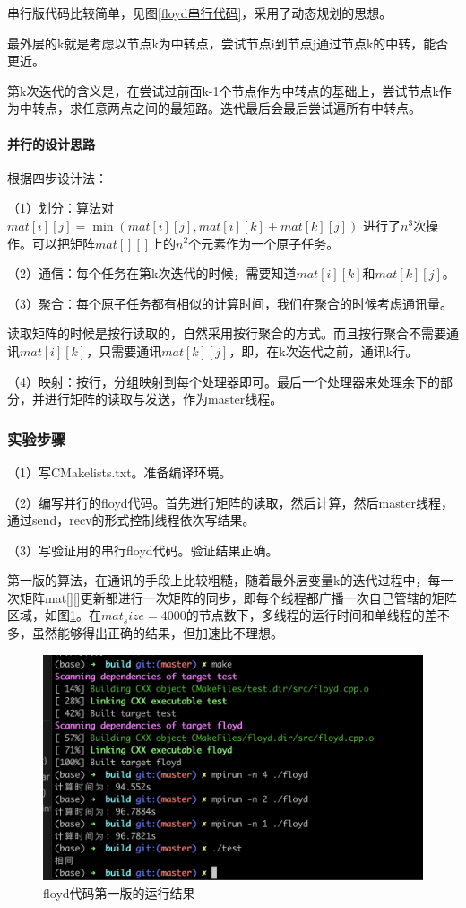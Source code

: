 \documentclass[10pt]{article}
\begin{document}
串行版代码比较简单，见图\ref{floyd串行代码}，采用了动态规划的思想。

最外层的k就是考虑以节点k为中转点，尝试节点i到节点j通过节点k的中转，能否更近。

第k次迭代的含义是，在尝试过前面k-1个节点作为中转点的基础上，尝试节点k作为中转点，求任意两点之间的最短路。迭代最后会最后尝试遍所有中转点。

\paragraph{并行的设计思路} 

根据四步设计法：

（1）划分：算法对$mat[i][j] = \min(mat[i][j], mat[i][k] + mat[k][j])$ 进行了$n^{3}$次操作。可以把矩阵$mat[][]$上的$n^{2}$个元素作为一个原子任务。

（2）通信：每个任务在第k次迭代的时候，需要知道$mat[i][k]$和$mat[k][j]$。

（3）聚合：每个原子任务都有相似的计算时间，我们在聚合的时候考虑通讯量。

读取矩阵的时候是按行读取的，自然采用按行聚合的方式。而且按行聚合不需要通讯$mat[i][k]$，只需要通讯$mat[k][j]$，即，在k次迭代之前，通讯k行。

（4）映射：按行，分组映射到每个处理器即可。最后一个处理器来处理余下的部分，并进行矩阵的读取与发送，作为master线程。


\subsubsection{实验步骤}

（1）写CMakelists.txt。准备编译环境。

（2）编写并行的floyd代码。首先进行矩阵的读取，然后计算，然后master线程，通过send，recv的形式控制线程依次写结果。

（3）写验证用的串行floyd代码。验证结果正确。

第一版的算法，在通讯的手段上比较粗糙，随着最外层变量k的迭代过程中，每一次矩阵mat[][]更新都进行一次矩阵的同步，即每个线程都广播一次自己管辖的矩阵区域，如图\ref{floyd代码第一版的运行结果}。在$mat_size=4000$的节点数下，多线程的运行时间和单线程的差不多，虽然能够得出正确的结果，但加速比不理想。

\begin{figure}[htbp]
    \centering
    \includegraphics[width=.6\textwidth]{assets/floyd命令行运行界面.png}
    \caption{floyd代码第一版的运行结果}
    \label{floyd代码第一版的运行结果}
\end{figure}
\end{document}
